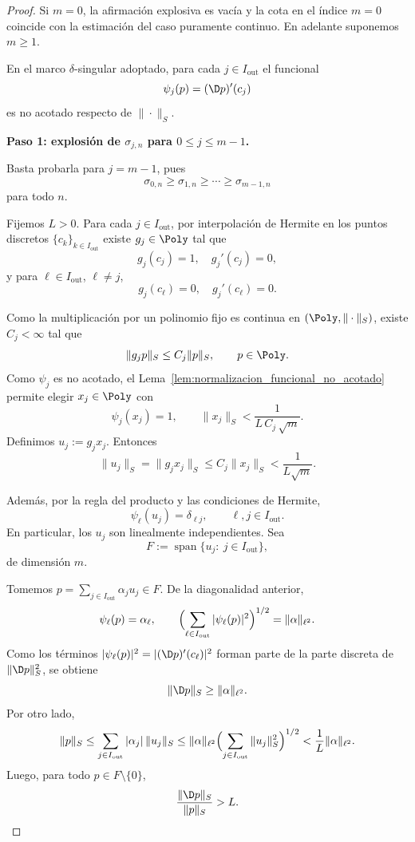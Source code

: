 \begin{proof}
	Si $m=0$, la afirmación explosiva es vacía y la cota en el índice $m=0$ coincide con la
	estimación del caso puramente continuo. En adelante suponemos $m\ge 1$.

	En el marco $\delta$-singular adoptado, para cada $j\in I_{\mathrm{out}}$ el funcional
	\[
		\psi_j(p)=(\D p)'(c_j)
	\]
	es no acotado respecto de $\|\cdot\|_S$.

	\medskip
	\noindent
	\textbf{Paso 1: explosión de $\sigma_{j,n}$ para $0\le j\le m-1$.}

	Basta probarla para $j=m-1$, pues
	\[
		\sigma_{0,n}\ge\sigma_{1,n}\ge\cdots\ge\sigma_{m-1,n}
	\]
	para todo $n$.

	Fijemos $L>0$. Para cada $j\in I_{\mathrm{out}}$, por interpolación de Hermite en los
	puntos discretos $\{c_k\}_{k\in I_{\mathrm{out}}}$ existe $g_j\in\Poly$ tal que
	\[
		g_j(c_j)=1,\quad g_j'(c_j)=0,
	\]
	y para $\ell\in I_{\mathrm{out}}$, $\ell\ne j$,
	\[
		g_j(c_\ell)=0,\quad g_j'(c_\ell)=0.
	\]

	Como la multiplicación por un polinomio fijo es continua en
	$(\Poly,\|\cdot\|_S)$, existe $C_j<\infty$ tal que
	\[
		\|g_jp\|_S\le C_j\|p\|_S,
		\qquad p\in\Poly.
	\]
	Como $\psi_j$ es no acotado, el Lema~\ref{lem:normalizacion_funcional_no_acotado}
	permite elegir $x_j\in\Poly$ con
	\[
		\psi_j(x_j)=1,
		\qquad
		\|x_j\|_S<\frac{1}{L\,C_j\,\sqrt m}.
	\]
	Definimos $u_j:=g_jx_j$. Entonces
	\[
		\|u_j\|_S=\|g_jx_j\|_S\le C_j\|x_j\|_S<\frac{1}{L\sqrt m}.
	\]

	Además, por la regla del producto y las condiciones de Hermite,
	\[
		\psi_\ell(u_j)=\delta_{\ell j},
		\qquad \ell,j\in I_{\mathrm{out}}.
	\]
	En particular, los $u_j$ son linealmente independientes. Sea
	\[
		F:=\operatorname{span}\{u_j:\ j\in I_{\mathrm{out}}\},
	\]
	de dimensión $m$.

	Tomemos $p=\sum_{j\in I_{\mathrm{out}}}\alpha_ju_j\in F$. De la diagonalidad anterior,
	\[
		\psi_\ell(p)=\alpha_\ell,
		\qquad
		\Bigl(\sum_{\ell\in I_{\mathrm{out}}}|\psi_\ell(p)|^2\Bigr)^{1/2}=\|\alpha\|_{\ell^2}.
	\]
	Como los términos $|\psi_\ell(p)|^2=|(\D p)'(c_\ell)|^2$ forman parte de la parte
	discreta de $\|\D p\|_S^2$, se obtiene
	\[
		\|\D p\|_S\ge \|\alpha\|_{\ell^2}.
	\]
	Por otro lado,
	\[
		\|p\|_S
		\le
		\sum_{j\in I_{\mathrm{out}}}|\alpha_j|\,\|u_j\|_S
		\le
		\|\alpha\|_{\ell^2}\Bigl(\sum_{j\in I_{\mathrm{out}}}\|u_j\|_S^2\Bigr)^{1/2}
		<
		\frac1L\|\alpha\|_{\ell^2}.
	\]
	Luego, para todo $p\in F\setminus\{0\}$,
	\[
		\frac{\|\D p\|_S}{\|p\|_S}>L.
	\]


\end{proof}
